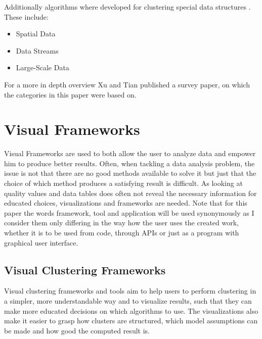 \documentclass[
	a4paper,
	english,
	twoside,
	openright,               
	11pt                            
	]{report}
\begin{document}
Additionally algorithms where developed for clustering special data structures \cite{surveyclustering}. These include:

\begin{itemize}
  \item Spatial Data
  \item Data Streams
  \item Large-Scale Data
\end{itemize}

For a more in depth overview Xu and Tian \cite{surveyclustering} published a survey paper, on which the categories in this paper were based on.

\section{Visual Frameworks}
Visual Frameworks are used to both allow the user to analyze data and empower him to produce better results. Often, when tackling a data analysis problem, the issue is not that there are no good methods available to solve it but just that the choice of which method produces a satisfying result is difficult. As looking at quality values and data tables does often not reveal the necessary information for educated choices, visualizations and frameworks are needed. Note that for this paper the words framework, tool and application will be used synonymously as I consider them only differing in the way how the user uses the created work, whether it is to be used from code, through APIs or just as a program with graphical user interface.

\subsection{Visual Clustering Frameworks}
Visual clustering frameworks and tools aim to help users to perform clustering in a simpler, more understandable way and to visualize results, such that they can make more educated decisions on which algorithms to use. The visualizations also make it easier to grasp how clusters are structured, which model assumptions can be made and how good the computed result is.
\end{document}
